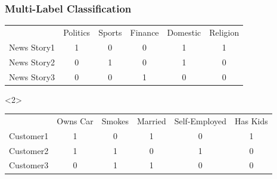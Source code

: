 \documentclass[final,ignorenonframetext,compress]{beamer}
\begin{document}
\begin{frame}
    \frametitle{Multi-Label Classification}

    \begin{table}
        \begin{tabularx}{\linewidth}{lccccc}
            \toprule
            & \footnotesize{Politics} & \footnotesize{Sports} & \footnotesize{Finance} & \footnotesize{Domestic} & \footnotesize{Religion}\\
            \cmidrule{2-6}
            News Story1 & 1 & 0 & 0 & 1 & 1\\
            News Story2 & 0 & 1 & 0 & 1 & 0\\
            News Story3 & 0 & 0 & 1 & 0 & 0\\
            \bottomrule
        \end{tabularx}
    \end{table}

    \begin{visibleenv}<2>
    \begin{table}
        \begin{tabularx}{\linewidth}{lccccc}
            \toprule
            & \footnotesize{Owns Car} & \footnotesize{Smokes} & \footnotesize{Married} & \footnotesize{Self-Employed} & \footnotesize{Has Kids}\\
            \cmidrule{2-6}
            Customer1 & 1 & 0 & 1 & 0 & 1\\
            Customer2 & 1 & 1 & 0 & 1 & 0\\
            Customer3 & 0 & 1 & 1 & 0 & 0\\
            \bottomrule
        \end{tabularx}
    \end{table}
    \end{visibleenv}
    
\end{frame}
\end{document}
